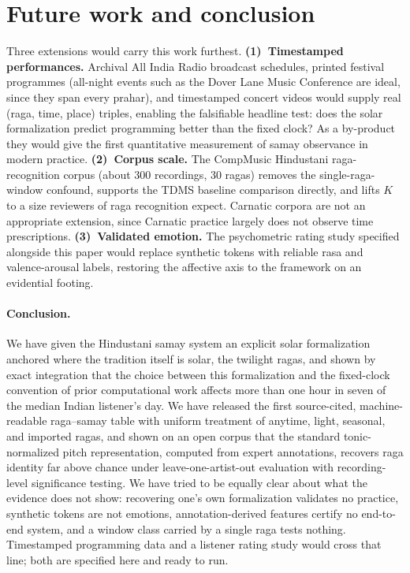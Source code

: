 \documentclass[11pt]{article}
\begin{document}
\section{Future work and conclusion}\label{sec:future}

Three extensions would carry this work furthest. \textbf{(1)~Timestamped
performances.} Archival All India Radio broadcast schedules, printed festival
programmes (all-night events such as the Dover Lane Music Conference are
ideal, since they span every prahar), and timestamped concert videos would
supply real (raga, time, place) triples, enabling the falsifiable headline
test: does the solar formalization predict programming better than the fixed
clock? As a by-product they would give the first quantitative measurement of
samay observance in modern practice. \textbf{(2)~Corpus scale.} The
CompMusic Hindustani raga-recognition corpus (about 300 recordings, 30 ragas)
removes the single-raga-window confound, supports the TDMS baseline
comparison directly, and lifts $K$ to a size reviewers of raga recognition
expect. Carnatic corpora are not an appropriate extension, since Carnatic
practice largely does not observe time prescriptions.
\textbf{(3)~Validated emotion.} The psychometric rating study specified
alongside this paper would replace synthetic tokens with reliable rasa and
valence-arousal labels, restoring the affective axis to the framework on an
evidential footing.

\paragraph{Conclusion.}
We have given the Hindustani samay system an explicit solar formalization
anchored where the tradition itself is solar, the twilight ragas, and shown
by exact integration that the choice between this formalization and the
fixed-clock convention of prior computational work affects more than one
hour in seven of the median Indian listener's day. We have released the
first source-cited, machine-readable raga--samay table with uniform
treatment of anytime, light, seasonal, and imported ragas, and shown on an
open corpus that the standard tonic-normalized pitch representation,
computed from expert annotations, recovers raga identity far above chance
under leave-one-artist-out evaluation with recording-level significance
testing. We have tried to be equally clear about what the evidence does not
show: recovering one's own formalization validates no practice, synthetic
tokens are not emotions, annotation-derived features certify no end-to-end
system, and a window class carried by a single raga tests nothing.
Timestamped programming data and a listener rating study would cross that
line; both are specified here and ready to run.
\end{document}
